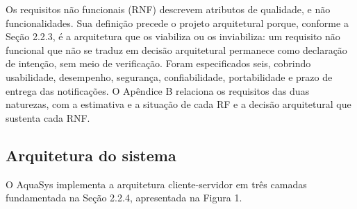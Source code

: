 \documentclass[12pt,oneside,a4paper,brazilian]{abntex2}
\begin{document}
Os requisitos não funcionais (RNF) descrevem atributos de qualidade, e não funcionalidades. Sua definição precede o projeto arquitetural porque, conforme a Seção 2.2.3, é a arquitetura que os viabiliza ou os inviabiliza: um requisito não funcional que não se traduz em decisão arquitetural permanece como declaração de intenção, sem meio de verificação. Foram especificados seis, cobrindo usabilidade, desempenho, segurança, confiabilidade, portabilidade e prazo de entrega das notificações. O Apêndice B relaciona os requisitos das duas naturezas, com a estimativa e a situação de cada RF e a decisão arquitetural que sustenta cada RNF.


\subsection{Arquitetura do sistema}
O AquaSys implementa a arquitetura cliente-servidor em três camadas fundamentada na Seção 2.2.4, apresentada na Figura 1.
\end{document}
